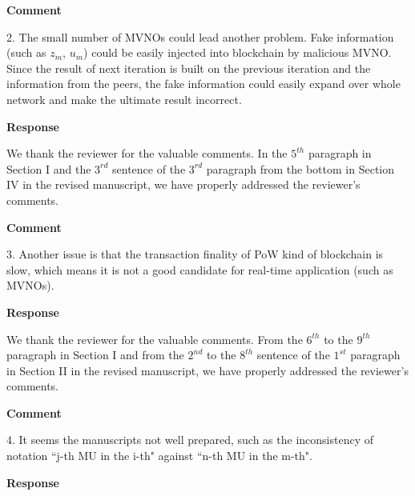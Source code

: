 \documentclass[12pt,draftcls, onecolumn]{IEEEtran}
\begin{document}
\vspace{3mm}
\noindent\textcolor[rgb]{1.00,0.00,0.00}{\textbf{Comment}}
\vspace{3mm}

2. The small number of MVNOs could lead another problem. Fake information (such as $z_m$, $u_m$) could be easily injected into blockchain by malicious MVNO. Since the result of next iteration is built on the previous iteration and the information from the peers, the fake information could easily expand over whole network and make the ultimate result incorrect.


\vspace{3mm} \noindent\textcolor[rgb]{0.00,0.00,1.00}{\textbf{Response}}
\vspace{2mm}

We thank the reviewer for the valuable comments. In the $ 5^{th} $ paragraph in Section I and the $ 3^{rd} $ sentence of the  $ 3^{rd} $ paragraph from the bottom in Section IV in the revised manuscript, we have properly addressed the reviewer's comments.

\vspace{3mm}
\noindent\textcolor[rgb]{1.00,0.00,0.00}{\textbf{Comment}}
\vspace{3mm}

3. Another issue is that the transaction finality of PoW kind of blockchain is slow, which means it is not a good candidate for real-time application (such as MVNOs).

\vspace{3mm} \noindent\textcolor[rgb]{0.00,0.00,1.00}{\textbf{Response}}
\vspace{2mm}

We thank the reviewer for the valuable comments. From the $ 6^{th} $ to the $ 9^{th} $ paragraph in Section I and from the $ 2^{nd} $ to the $ 8^{th} $ sentence of the $ 1^{st} $ paragraph in Section II in the revised manuscript, we have properly addressed the reviewer's comments.

\vspace{3mm}
\noindent\textcolor[rgb]{1.00,0.00,0.00}{\textbf{Comment}}
\vspace{3mm}


4. It seems the manuscripts not well prepared, such as the inconsistency of notation ``j-th MU in the i-th" against ``n-th MU in the m-th". 


\vspace{3mm} \noindent\textcolor[rgb]{0.00,0.00,1.00}{\textbf{Response}}
\vspace{2mm}
\end{document}
